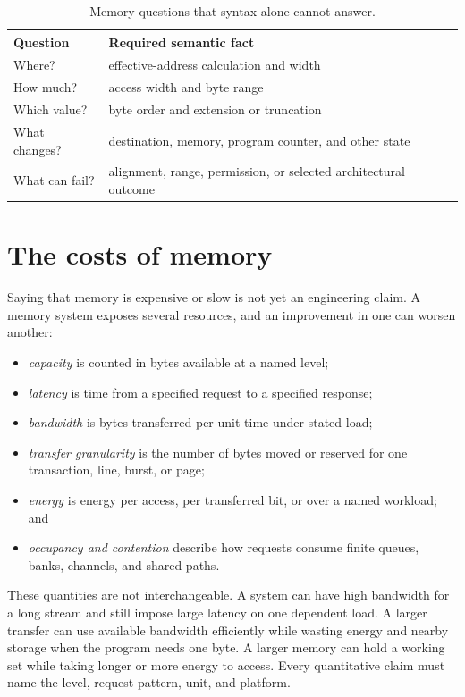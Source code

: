 \begin{table}
\centering
\caption{Memory questions that syntax alone cannot answer.}
\begin{tabular}{p{}p{}}
\toprule
Question & Required semantic fact \\
\midrule
Where? & effective-address calculation and width \\
How much? & access width and byte range \\
Which value? & byte order and extension or truncation \\
What changes? & destination, memory, program counter, and other state \\
What can fail? & alignment, range, permission, or selected architectural outcome \\
\bottomrule
\end{tabular}
\end{table}

\section{The costs of memory}

Saying that memory is expensive or slow is not yet an engineering claim. A
memory system exposes several resources, and an improvement in one can worsen
another:

\begin{itemize}
\item \emph{capacity} is counted in bytes available at a named level;
\item \emph{latency} is time from a specified request to a specified response;
\item \emph{bandwidth} is bytes transferred per unit time under stated load;
\item \emph{transfer granularity} is the number of bytes moved or reserved for
one transaction, line, burst, or page;
\item \emph{energy} is energy per access, per transferred bit, or over a named
workload; and
\item \emph{occupancy and contention} describe how requests consume finite
queues, banks, channels, and shared paths.
\end{itemize}

These quantities are not interchangeable. A system can have high bandwidth
for a long stream and still impose large latency on one dependent load. A
larger transfer can use available bandwidth efficiently while wasting energy
and nearby storage when the program needs one byte. A larger memory can hold a
working set while taking longer or more energy to access. Every quantitative
claim must name the level, request pattern, unit, and platform.

